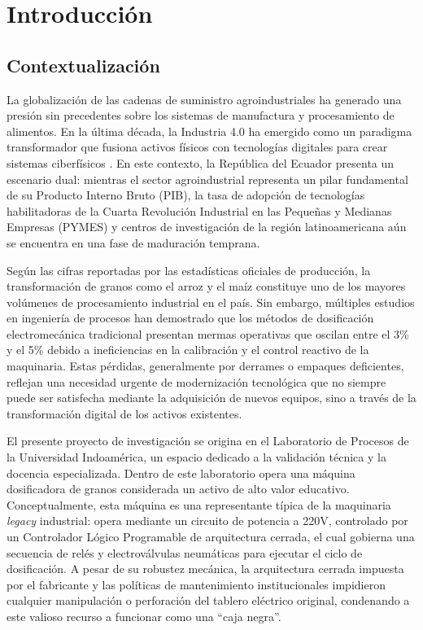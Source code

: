 \chapter{Introducción}
\label{chap:introduccion}

\section{Contextualización}

La globalización de las cadenas de suministro agroindustriales ha generado una presión sin precedentes sobre los sistemas de manufactura y procesamiento de alimentos. En la última década, la Industria 4.0 ha emergido como un paradigma transformador que fusiona activos físicos con tecnologías digitales para crear sistemas ciberfísicos \cite{monostori2016}. En este contexto, la República del Ecuador presenta un escenario dual: mientras el sector agroindustrial representa un pilar fundamental de su Producto Interno Bruto (PIB), la tasa de adopción de tecnologías habilitadoras de la Cuarta Revolución Industrial en las Pequeñas y Medianas Empresas (PYMES) y centros de investigación de la región latinoamericana aún se encuentra en una fase de maduración temprana.

Según las cifras reportadas por las estadísticas oficiales de producción, la transformación de granos como el arroz y el maíz constituye uno de los mayores volúmenes de procesamiento industrial en el país. Sin embargo, múltiples estudios en ingeniería de procesos han demostrado que los métodos de dosificación electromecánica tradicional presentan mermas operativas que oscilan entre el 3\% y el 5\% debido a ineficiencias en la calibración y el control reactivo de la maquinaria. Estas pérdidas, generalmente por derrames o empaques deficientes, reflejan una necesidad urgente de modernización tecnológica que no siempre puede ser satisfecha mediante la adquisición de nuevos equipos, sino a través de la transformación digital de los activos existentes.

El presente proyecto de investigación se origina en el Laboratorio de Procesos de la Universidad Indoamérica, un espacio dedicado a la validación técnica y la docencia especializada. Dentro de este laboratorio opera una máquina dosificadora de granos considerada un activo de alto valor educativo. Conceptualmente, esta máquina es una representante típica de la maquinaria \textit{legacy} industrial: opera mediante un circuito de potencia a 220V, controlado por un Controlador Lógico Programable de arquitectura cerrada, el cual gobierna una secuencia de relés y electroválvulas neumáticas para ejecutar el ciclo de dosificación. A pesar de su robustez mecánica, la arquitectura cerrada impuesta por el fabricante y las políticas de mantenimiento institucionales impidieron cualquier manipulación o perforación del tablero eléctrico original, condenando a este valioso recurso a funcionar como una ``caja negra''.

